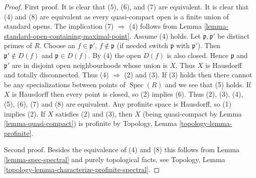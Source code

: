 \documentclass[10pt,a4paper]{amsart}
\theoremstyle{plain}
\theoremstyle{definition}
\theoremstyle{remark}
\numberwithin{equation}{subsection}
\def\Spec{\mathop{\mathrm{Spec}}}
\begin{document}
\begin{proof}
First proof. It is clear that (5), (6), and (7) are equivalent.
It is clear that (4) and (8) are equivalent as every quasi-compact
open is a finite union of standard opens.
The implication (7) $\Rightarrow$ (4) follows from
Lemma \ref{lemma-standard-open-containing-maximal-point}.
Assume (4) holds. Let $\mathfrak p, \mathfrak p'$ be distinct
primes of $R$. Choose an $f \in \mathfrak p'$, $f \not \in \mathfrak p$
(if needed switch $\mathfrak p$ with $\mathfrak p'$).
Then $\mathfrak p' \not \in D(f)$ and $\mathfrak p \in D(f)$.
By (4) the open $D(f)$ is also closed.
Hence $\mathfrak p$ and $\mathfrak p'$ are in disjoint open
neighbourhoods whose union is $X$. Thus $X$ is Hausdorff and totally
disconnected. Thus (4) $\Rightarrow$ (2) and (3).
If (3) holds then there cannot be any specializations
between points of $\Spec(R)$ and we see that (5) holds.
If $X$ is Hausdorff then every point is closed, so (2) implies (6).
Thus (2), (3), (4), (5), (6), (7) and (8) are equivalent.
Any profinite space is Hausdorff, so (1) implies (2).
If $X$ satisfies (2) and (3), then $X$ (being quasi-compact by
Lemma \ref{lemma-quasi-compact}) is profinite by
Topology, Lemma \ref{topology-lemma-profinite}.

\medskip\noindent
Second proof. Besides the equivalence of (4) and (8) this follows
from Lemma \ref{lemma-spec-spectral} and purely topological facts, see
Topology, Lemma \ref{topology-lemma-characterize-profinite-spectral}.
\end{proof}
\end{document}
